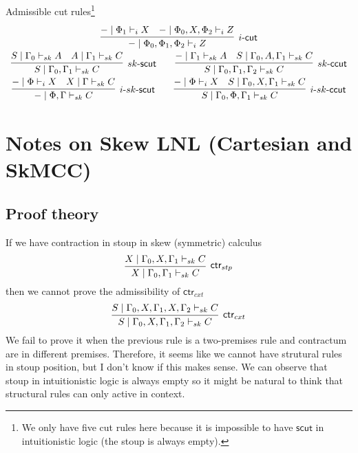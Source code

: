 \documentclass{article}
\newcommand{\td}{\text{-}}
\newcommand{\scut}{\mathsf{scut}}
\newcommand{\ccut}{\mathsf{ccut}}
\newcommand{\ctr}{\mathsf{ctr}}
\begin{document}
   Admissible cut rules\footnote{We only have five cut rules here because it is impossible to have $\scut$ in intuitionistic logic (the stoup is always empty).}
   \begin{displaymath}
     \begin{array}{cc}
       \infer[i\td\mathsf{cut}]{- \mid \Phi_{0} , \Phi_{1} , \Phi_{2} \vdash_{i} Z}{
        \deduce{- \mid \Phi_{1} \vdash_{i} X}{}
        &
        \deduce{- \mid \Phi_{0} , X , \Phi_{2} \vdash_{i} Z}{}
       }
        \\
        \infer[sk\td\scut]{S \mid \Gamma_{0} , \Gamma_{1} \vdash_{sk} C}{
         \deduce{S \mid \Gamma_{0} \vdash_{sk} A}{}
         &
         \deduce{A \mid \Gamma_{1} \vdash_{sk} C}{}
        }
        \qquad
        \infer[sk\td\ccut]{S \mid \Gamma_{0} , \Gamma_{1} , \Gamma_{2} \vdash_{sk} C}{
         \deduce{- \mid \Gamma_{1} \vdash_{sk} A}{}
         &
         \deduce{S \mid \Gamma_{0} , A , \Gamma_{1} \vdash_{sk} C}{}
       }
       \\
       \infer[i\td sk \td\scut]{- \mid \Phi , \Gamma \vdash_{sk} C}{
        \deduce{- \mid \Phi \vdash_{i} X}{}
        &
        \deduce{X \mid \Gamma \vdash_{sk} C}{}
       }
       \qquad
       \infer[i\td sk\td\ccut]{S \mid \Gamma_{0} , \Phi , \Gamma_{1} \vdash_{sk} C}{
        \deduce{- \mid \Phi \vdash_{i} X}{}
        &
        \deduce{S \mid \Gamma_{0} , X , \Gamma_{1} \vdash_{sk} C}{}
       }
     \end{array}
   \end{displaymath}
  \section*{Notes on Skew LNL (Cartesian and SkMCC)}
  \subsection*{Proof theory}
  If we have contraction in stoup in skew (symmetric) calculus
  \begin{displaymath}
    \infer[\mathsf{ctr}_{stp}]{X \mid \Gamma_{0} , \Gamma_{1} \vdash_{sk} C}{X \mid \Gamma_{0} , X, \Gamma_{1} \vdash_{sk} C}
  \end{displaymath}
  then we cannot prove the admissibility of $\ctr_{cxt}$
  \begin{displaymath}
    \infer[\ctr_{cxt}]{S \mid \Gamma_{0} , X , \Gamma_{1} , \Gamma_{2} \vdash_{sk} C}{S \mid \Gamma_{0} , X , \Gamma_{1} , X , \Gamma_{2} \vdash_{sk} C}
  \end{displaymath}
  We fail to prove it when the previous rule is a two-premises rule and contractum are in different premises.
  Therefore, it seems like we cannot have strutural rules in stoup position, but I don't know if this makes sense.
  We can observe that stoup in intuitionistic logic is always empty so it might be natural to think that structural rules can only active in context.
\end{document}

